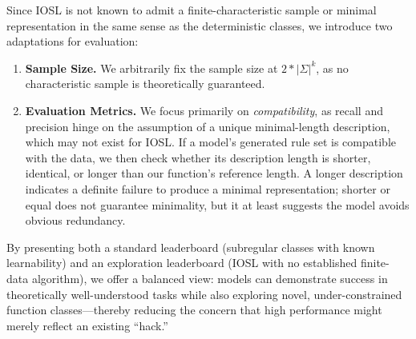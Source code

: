 Since IOSL is not known to admit a finite-characteristic sample or minimal representation in the same sense as the deterministic classes, we introduce two adaptations for evaluation:

\begin{enumerate}[leftmargin=*, itemsep=1pt] \item \textbf{Sample Size.} We arbitrarily fix the sample size at $2*|\Sigma|^k$, as no characteristic sample is theoretically guaranteed.

\item \textbf{Evaluation Metrics.} We focus primarily on \emph{compatibility}, as recall and precision hinge on the assumption of a unique minimal-length description, which may not exist for IOSL. If a model's generated rule set is compatible with the data, we then check whether its description length is shorter, identical, or longer than our function's reference length. A longer description indicates a definite failure to produce a minimal representation; shorter or equal does not guarantee minimality, but it at least suggests the model avoids obvious redundancy. \end{enumerate}

By presenting both a standard leaderboard (subregular classes with known learnability) and an exploration leaderboard (IOSL with no established finite-data algorithm), we offer a balanced view: models can demonstrate success in theoretically well-understood tasks while also exploring novel, under-constrained function classes—thereby reducing the concern that high performance might merely reflect an existing ``hack.''


